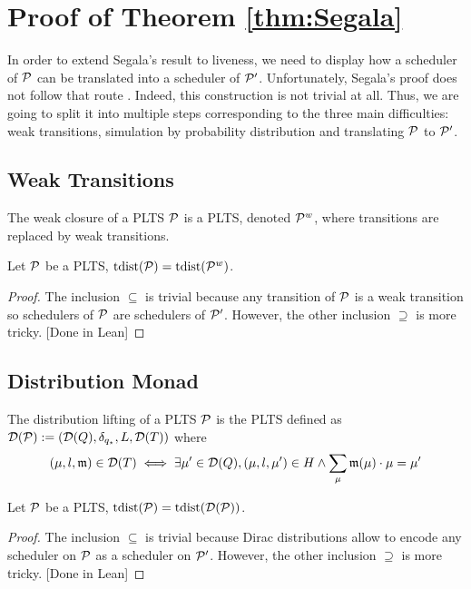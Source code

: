 \clearpage
\section{Proof of Theorem \ref{thm:Segala}}
\label{app:ProofSegala}

In order to extend Segala's result to liveness, we need to display how a scheduler of $\mathcal{P}$ can
be translated into a scheduler of $\mathcal{P}'$. Unfortunately, Segala's proof does not follow that 
route \cite{Segala1995PhD}. Indeed, this construction is not trivial at all. Thus, we are going to
split it into multiple steps corresponding to the three main difficulties: weak transitions, 
simulation by probability distribution and translating $\mathcal{P}$ to $\mathcal{P}'$.

\subsection{Weak Transitions}

\begin{definition}
    The weak closure of a PLTS $\mathcal{P}$ is a PLTS, denoted $\mathcal{P}^w$, where transitions are replaced
    by weak transitions.
\end{definition}

\begin{lemma}
    \label{lem:weakclosuresound}
    Let $\mathcal{P}$ be a PLTS, $\text{tdist}(\mathcal{P}) = \text{tdist}(\mathcal{P}^w)$.
\end{lemma}
\begin{proof}
    The inclusion $\subseteq$ is trivial because any transition of $\mathcal{P}$ is a weak transition so
    schedulers of $\mathcal{P}$ are schedulers of $\mathcal{P}'$. However, the other inclusion $\supseteq$ is
    more tricky. [Done in Lean]
\end{proof}

\subsection{Distribution Monad}

\begin{definition}
    The distribution lifting of a PLTS $\mathcal{P}$ is the PLTS defined as 
    $\mathcal{D}(\mathcal{P}) := (\mathcal{D}(Q), \delta_{q_\star}, L, \mathcal{D}(T))$ where
    \[(\mu,l,\mathfrak{m}) \in \mathcal{D}(T) \iff \exists \mu' \in \mathcal{D}(Q), (\mu,l,\mu') \in H \wedge \sum_{\mu}\mathfrak{m}(\mu)\cdot\mu = \mu'\]
\end{definition}

\begin{lemma}
    \label{lem:distliftingsound}
    Let $\mathcal{P}$ be a PLTS, $\text{tdist}(\mathcal{P}) = \text{tdist}(\mathcal{D}(\mathcal{P}))$.
\end{lemma}
\begin{proof}
    The inclusion $\subseteq$ is trivial because Dirac distributions allow to encode any scheduler
    on $\mathcal{P}$ as a scheduler on $\mathcal{P}'$. However, the other inclusion $\supseteq$ is more tricky.
    [Done in Lean]
\end{proof}

